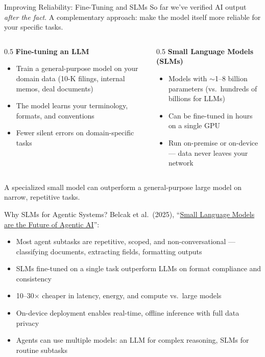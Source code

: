 \documentclass[aspectratio=169]{beamer}
\begin{document}
\begin{frame}{Improving Reliability: Fine-Tuning and SLMs}
So far we've verified AI output \textit{after the fact}.  A complementary approach: make the model itself more reliable for your specific tasks.
\vspace{0.3cm}
\begin{columns}[T]
\begin{column}{0.5\textwidth}
\textbf{Fine-tuning an LLM}
\begin{itemize}\small
  \item Train a general-purpose model on your domain data (10-K filings, internal memos, deal documents)
  \item The model learns your terminology, formats, and conventions
  \item Fewer silent errors on domain-specific tasks
\end{itemize}
\end{column}
\begin{column}{0.5\textwidth}
\textbf{Small Language Models (SLMs)}
\begin{itemize}\small
  \item Models with $\sim$1--8 billion parameters (vs.\ hundreds of billions for LLMs)
  \item Can be fine-tuned in hours on a single GPU
  \item Run on-premise or on-device --- \alert{data never leaves your network}
\end{itemize}
\end{column}
\end{columns}
\vspace{0.3cm}
\alert{A specialized small model can outperform a general-purpose large model on narrow, repetitive tasks.}
\end{frame}

\begin{frame}{Why SLMs for Agentic Systems?}
Belcak et al.\ (2025), ``\href{https://arxiv.org/abs/2506.02153}{Small Language Models are the Future of Agentic AI}'':
\vspace{0.3cm}
\begin{itemize}
  \item Most agent subtasks are \alert{repetitive, scoped, and non-conversational} --- classifying documents, extracting fields, formatting outputs
  \item SLMs fine-tuned on a single task outperform LLMs on format compliance and consistency
  \item 10--30$\times$ cheaper in latency, energy, and compute vs.\ large models
  \item On-device deployment enables real-time, offline inference with full data privacy
  \item Agents can use \alert{multiple models}: an LLM for complex reasoning, SLMs for routine subtasks
\end{itemize}
\end{frame}
\end{document}

